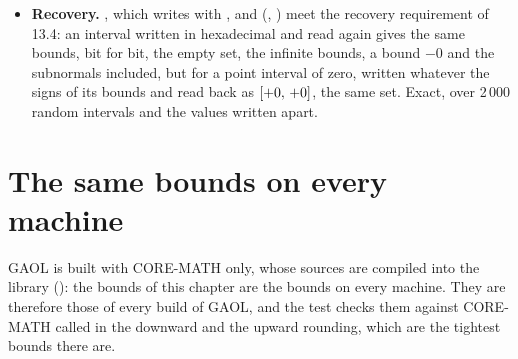 \documentclass[12pt,a4paper,twoside,openright]{book}
\begin{document}
\begin{itemize}
  the radius written at least the exact half-width and  rounded
  upward with less than one unit of its last digit, $\itv{c-w}{c+w}$
  containing $x$, and the midpoint written to nearest with at most half a
  unit of its last digit, over the special values, the subnormals, the
  largest doubles and random intervals, every precision and flag.
\item[$\bullet$] \textbf{Recovery.} , which
   writes with , and
   (,
  ) meet the recovery requirement of 13.4: an
  interval written in hexadecimal and read again gives the same bounds, bit
  for bit, the empty set, the infinite bounds, a bound $-0$ and the
  subnormals included, but for a point interval of zero, written
  \code{[0x0p+0]} whatever the signs of its bounds and read back as
  $[+0,\,+0]$, the same set.\newinvfive{} Exact, over 2\,000 random
  intervals and the values written apart.
\end{itemize}

\section{The same bounds on every machine}\label{sec:accuracy-same-bounds}
%
%

GAOL is built with CORE-MATH only, whose sources are compiled into the
library (): the bounds of this chapter are the
bounds on every machine. They are therefore those of every build of GAOL,
and the test  checks them against CORE-MATH
called in the downward and the upward rounding, which are the tightest
bounds there are.
\end{document}
